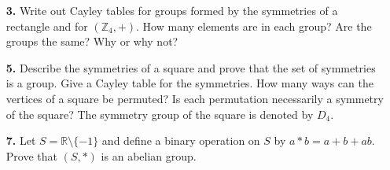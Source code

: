 \documentclass[12pt,reqno]{amsart}
\begin{document}
\begin{enumerate}
\begin{multicols}{2}
\begin{enumerate}
\item
\[
\begin{array}{c|cccc}
\circ & a & b & c & d \\
\hline
a & a & b & c & d \\
b & b & a & d & c \\
c & c & d & a & b \\
d & d & c & b & a
\end{array}
\]
 
\item
\[
\begin{array}{c|cccc}
\circ & a & b & c & d \\
\hline
a & a & b & c & d \\
b & b & c & d & a \\
c & c & d & a & b \\
d & d & a & b & c
\end{array}
\]

\item
\[
\begin{array}{c|cccc}
\circ & a & b & c & d \\
\hline
a & a & b & c & d \\
b & b & a & c & d \\
c & c & b & a & d \\
d & d & d & b & c
\end{array}
\]

\end{enumerate}
\end{multicols}

\medskip

\item[{\bf 3.}]
Write out Cayley tables for groups formed by the symmetries of a
rectangle and for $({\mathbb Z}_4, +)$. How many elements are in each
group? Are the groups the same? Why or why not? 
 
 
\medskip

\item[{\bf 5.}]
Describe the symmetries of a square and prove that the set of
symmetries is a group. Give a Cayley table for the symmetries. How
many ways can the vertices of a square be permuted?  Is each
permutation necessarily a symmetry of the square?  The symmetry group
of the square is denoted by $D_4$.
 
\medskip

\item[{\bf 7.}]
Let $S = {\mathbb R} \setminus \{ -1 \}$ and define a binary operation on
$S$ by $a \ast b = a + b +ab$. Prove that $(S, \ast)$ is an abelian
group.
 


\end{enumerate}
\end{document}
